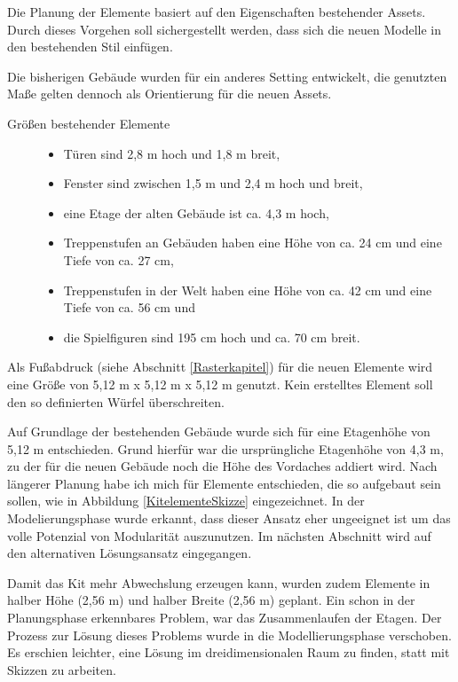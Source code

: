 \par
Die Planung der Elemente basiert auf den Eigenschaften bestehender Assets. Durch dieses Vorgehen soll sichergestellt werden, dass sich die neuen Modelle in den bestehenden Stil einfügen.
\par
Die bisherigen Gebäude wurden für ein anderes Setting entwickelt, die genutzten Maße gelten dennoch als Orientierung für die neuen Assets.
\newpage
\begin{description}
\item[Größen bestehender Elemente]\hfill
\begin{itemize}[leftmargin=0cm]
\item Türen sind 2,8 m hoch und 1,8 m breit,
\item Fenster sind zwischen 1,5 m und 2,4 m hoch und breit,
\item eine Etage der alten Gebäude ist ca. 4,3 m hoch,
\item Treppenstufen an Gebäuden haben eine Höhe  von ca. 24 cm und eine Tiefe von ca. 27 cm,
\item Treppenstufen in der Welt haben eine Höhe  von ca. 42 cm und eine Tiefe von ca. 56 cm und
\item die Spielfiguren sind 195 cm hoch und ca. 70 cm breit.
\end{itemize}
\end{description}
Als Fußabdruck (siehe Abschnitt \ref{Rasterkapitel}) für die neuen Elemente wird eine Größe von 5,12 m x 5,12 m x 5,12 m genutzt. Kein erstelltes Element soll den so definierten Würfel überschreiten.
\par
Auf Grundlage der bestehenden Gebäude wurde sich für eine Etagenhöhe von 5,12 m entschieden. Grund hierfür war die ursprüngliche Etagenhöhe von 4,3 m, zu der für die neuen Gebäude noch die Höhe des Vordaches addiert wird. Nach längerer Planung habe ich mich für Elemente entschieden, die so aufgebaut sein sollen, wie in Abbildung \ref{KitelementeSkizze} eingezeichnet. In der Modelierungsphase wurde erkannt, dass dieser Ansatz eher ungeeignet ist um das volle Potenzial von Modularität auszunutzen. Im nächsten Abschnitt wird auf den alternativen Lösungsansatz eingegangen.
\par\enlargethispage{14pt}
Damit das Kit mehr Abwechslung erzeugen kann, wurden zudem Elemente in halber Höhe (2,56 m) und halber Breite (2,56 m) geplant. Ein schon in der Planungsphase erkennbares Problem, war das Zusammenlaufen der Etagen. Der Prozess zur Lösung dieses Problems wurde in die Modellierungsphase verschoben. Es erschien leichter, eine Lösung im dreidimensionalen Raum zu finden, statt mit Skizzen zu arbeiten.
